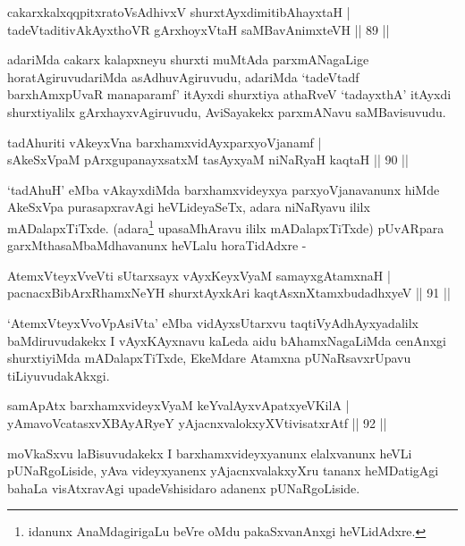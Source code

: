 \begin{shl}
cakarxkalxqqpitxratoV\s sAdhivxV shurxtAyxdimitibAhayxtaH |\\
tadeVtaditivAkAyxthoVR gArxhoyxV\s taH saMBavAnimxteVH \hfill || 89 ||
\end{shl}

\begin{artha}
adariMda cakarx kalapxneyu shurxti muMtAda parxmANagaLige horatAgiru\-vudariMda asAdhuvAgiruvudu, adariMda `tadeVtadf barxhAmxpUvaR manaparamf' itAyxdi shurxtiya athaRveV `tadayxthA' itAyxdi shurxtiyalilx gArxhayxvAgiruvudu, AviSayakekx parxmANavu saMBavisuvudu.
\end{artha}

\begin{shl}
tadAhuriti vAkeyxVna barxhamxvidAyxparxyoVjanamf |\\
sAkeSxVpaM pArxgupanayxsatxM tasAyxyaM niNaRyaH kaqtaH \hfill || 90 ||
\end{shl}

\begin{artha}
`tadAhuH' eMba vAkayxdiMda barxhamxvideyxya parxyoVjanavanunx hiMde
  AkeSxVpa purasapxravAgi heVLideyaSeTx, adara niNaRyavu ililx
  mADalapxTiTxde. (adara\footnote[1]{idanunx AnaMdagirigaLu beVre oMdu
  pakaSxvanAnxgi heVLidAdxre.} upasaMhAravu ililx
  mADalapxTiTxde) pUvARpara garxMthasaMbaMdhavanunx heVLalu
  horaTidAdxre -
\end{artha}

\begin{shl}
AtemxVteyxVveVti sUtarxsayx vAyxKeyxVyaM samayxgAtamxnaH |\\
pacnacxBibArxRhamxNeYH shurxtAyx\s kAri kaqtAsxnXtamxbudadhxyeV \hfill || 91 ||
\end{shl}

\begin{artha}
`AtemxVteyxVvoVpAsiVta' eMba vidAyxsUtarxvu taqtiVyAdhAyxyadalilx baMdiru\-vudakekx I   vAyxKAyxnavu kaLeda aidu bAhamxNagaLiMda cenAnxgi shurxtiyiMda   mADalapxTiTxde, EkeMdare Atamxna pUNaRsavxrUpavu tiLiyuvudakAkxgi.
\end{artha}

\begin{shl}
samApAtx barxhamxvideyxVyaM keYvalAyxvApatxyeV\s KilA |\\
yAmavoVcatasxvXBAyARyeY yAjacnxvalokxyXV\s tivisatxrAtf \hfill || 92 ||
\end{shl}

\begin{artha}
moVkaSxvu laBisuvudakekx I barxhamxvideyxyanunx elalxvanunx heVLi pUNaRgoLiside, yAva videyxyanenx yAjacnxvalakxyXru tananx heMDatigAgi bahaLa visAtxravAgi upadeVshisidaro adanenx pUNaRgoLiside.
\end{artha}

